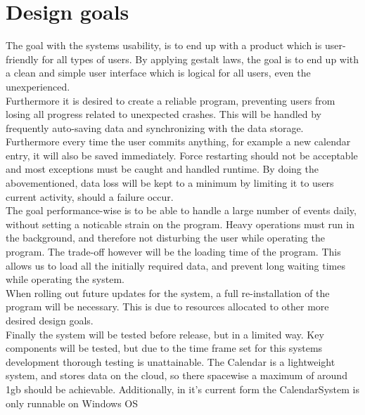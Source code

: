 \section{Design goals}
The goal with the systems usability, is to end up with a product which is user-friendly for all types of users. By applying gestalt laws, the goal is to end up with a clean and simple user interface which is logical for all users, even the unexperienced.\\
Furthermore it is desired to create a reliable program, preventing users from losing all progress related to unexpected crashes. This will be handled by frequently auto-saving data and synchronizing with the data storage. Furthermore every time the user commits anything, for example a new calendar entry, it will also be saved immediately. Force restarting should not be acceptable and most exceptions must be caught and handled runtime. By doing the abovementioned, data loss will be kept to a minimum by limiting it to users current activity, should a failure occur.\\
The goal performance-wise is to be able to handle a large number of events daily, without setting a noticable strain on the program. Heavy operations must run in the background, and therefore not disturbing the user while operating the program. The trade-off however will be the loading time of the program. This allows us to load all the initially required data, and prevent long waiting times while operating the system.\\
When rolling out future updates for the system, a full re-installation of the program will be necessary. This is due to resources allocated to other more desired design goals.\\
Finally the system will be tested before release, but in a limited way. Key components will be tested, but due to the time frame set for this systems development thorough testing is unattainable. The Calendar is a lightweight system, and stores data on the cloud, so there spacewise a maximum of around 1gb should be achievable. Additionally, in it's current form the CalendarSystem is only runnable on Windows OS\\